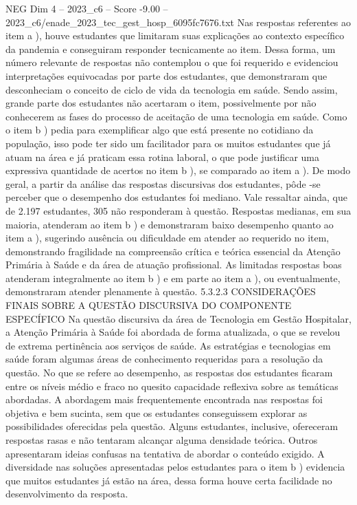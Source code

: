 \begin{textsample}{NEG Dim 4 – 2023\_c6 – Score -9.00 – 2023\_c6/enade\_2023\_tec\_gest\_hosp\_6095fc7676.txt}
Nas respostas referentes ao item a ), houve estudantes que limitaram suas explicações ao contexto específico da pandemia e conseguiram responder tecnicamente ao item.
Dessa forma, um número relevante de respostas não contemplou o que foi requerido e evidenciou interpretações equivocadas por parte dos estudantes, que demonstraram que desconheciam o conceito de ciclo de vida da tecnologia em saúde.
Sendo assim, grande parte dos estudantes não acertaram o item, possivelmente por não conhecerem as fases do processo de aceitação de uma tecnologia em saúde.
Como o item b ) pedia para exemplificar algo que está presente no cotidiano da população, isso pode ter sido um facilitador para os muitos estudantes que já atuam na área e já praticam essa rotina laboral, o que pode justificar uma expressiva quantidade de acertos no item b ), se comparado ao item a ).
De modo geral, a partir da análise das respostas discursivas dos estudantes, pôde -se perceber que o desempenho dos estudantes foi mediano.
Vale ressaltar ainda, que de 2.197 estudantes, 305 não responderam à questão.
Respostas medianas, em sua maioria, atenderam ao item b ) e demonstraram baixo desempenho quanto ao item a ), sugerindo ausência ou dificuldade em atender ao requerido no item, demonstrando fragilidade na compreensão crítica e teórica essencial da Atenção Primária à Saúde e da área de atuação profissional.
As limitadas respostas boas atenderam integralmente ao item b ) e em parte ao item a ), ou eventualmente, demonstraram atender plenamente à questão. 5.3.2.3 CONSIDERAÇÕES FINAIS SOBRE A QUESTÃO DISCURSIVA DO COMPONENTE ESPECÍFICO Na questão discursiva da área de Tecnologia em Gestão Hospitalar, a Atenção Primária à Saúde foi abordada de forma atualizada, o que se revelou de extrema pertinência aos serviços de saúde.
As estratégias e tecnologias em saúde foram algumas áreas de conhecimento requeridas para a resolução da questão.
No que se refere ao desempenho, as respostas dos estudantes ficaram entre os níveis médio e fraco no quesito capacidade reflexiva sobre as temáticas abordadas.
A abordagem mais frequentemente encontrada nas respostas foi objetiva e bem sucinta, sem que os estudantes conseguissem explorar as possibilidades oferecidas pela questão.
Alguns estudantes, inclusive, ofereceram respostas rasas e não tentaram alcançar alguma densidade teórica.
Outros apresentaram ideias confusas na tentativa de abordar o conteúdo exigido.
A diversidade nas soluções apresentadas pelos estudantes para o item b ) evidencia que muitos estudantes já estão na área, dessa forma houve certa facilidade no desenvolvimento da resposta.

\end{textsample}
